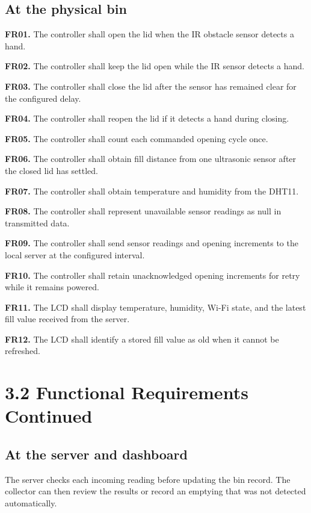 \documentclass[11pt,a4paper]{article}
\begin{document}
\subsection*{At the physical bin}
\textbf{FR01.} The controller shall open the lid when the IR obstacle sensor detects a hand.\par
\textbf{FR02.} The controller shall keep the lid open while the IR sensor detects a hand.\par
\textbf{FR03.} The controller shall close the lid after the sensor has remained clear for the configured delay.\par
\textbf{FR04.} The controller shall reopen the lid if it detects a hand during closing.\par
\textbf{FR05.} The controller shall count each commanded opening cycle once.\par
\textbf{FR06.} The controller shall obtain fill distance from one ultrasonic sensor after the closed lid has settled.\par
\textbf{FR07.} The controller shall obtain temperature and humidity from the DHT11.\par
\textbf{FR08.} The controller shall represent unavailable sensor readings as null in transmitted data.\par
\textbf{FR09.} The controller shall send sensor readings and opening increments to the local server at the configured interval.\par
\textbf{FR10.} The controller shall retain unacknowledged opening increments for retry while it remains powered.\par
\textbf{FR11.} The LCD shall display temperature, humidity, Wi-Fi state, and the latest fill value received from the server.\par
\textbf{FR12.} The LCD shall identify a stored fill value as old when it cannot be refreshed.\par

\clearpage
\section*{3.2 Functional Requirements Continued}
\subsection*{At the server and dashboard}
The server checks each incoming reading before updating the bin record. The collector can then review the results or record an emptying that was not detected automatically.\par
\end{document}
